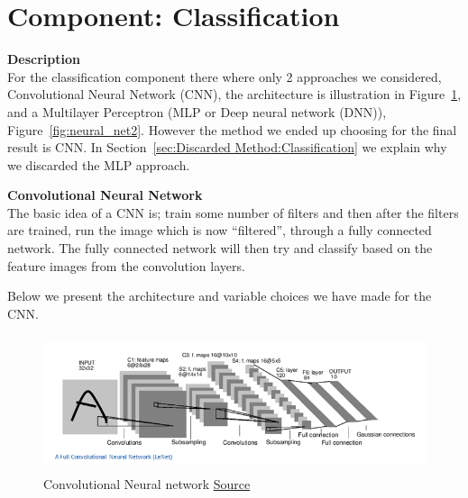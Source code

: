 \documentclass[Report.tex]{subfiles}
\begin{document}
\section{Component: Classification}
\label{Method:Classification}
\begin{flushleft}
  \textbf{Description} \\
  For the classification component there where only 2 approaches we considered,
  Convolutional Neural Network (CNN), the architecture is illustration in
  Figure~\ref{fig:CNN_architecture}, and a Multilayer Perceptron (MLP or Deep
  neural network (DNN)), Figure~\ref{fig:neural_net2}. However the method we ended up choosing for the final result is CNN. In
  Section~\ref{sec:Discarded Method:Classification} we explain why we discarded
  the MLP approach. \par
\end{flushleft}

\begin{flushleft}
  \textbf{Convolutional Neural Network} \\
  The basic idea of a CNN is; train some number of filters and then
  after the filters are trained, run the image which is now ``filtered'', through
  a fully connected network. The fully connected network will then try and
  classify based on the feature images from the convolution layers. \par
  Below we present the architecture and variable choices we have made for the CNN.
\end{flushleft}

\begin{figure}[H]
  \centering
  \includegraphics[height=4cm]{res/LeNet.png}
  \caption{Convolutional Neural network \href{https://adeshpande3.github.io/A-Beginner\%27s-Guide-To-Understanding-Convolutional-Neural-Networks/}{Source}}
  \label{fig:CNN_architecture}
\end{figure}

\end{document}
